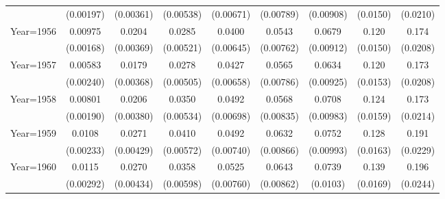 \begin{table}[htbp]
\begin{tabular}{l*{8}{c}}
                    &   (0.00197)         &   (0.00361)         &   (0.00538)         &   (0.00671)         &   (0.00789)         &   (0.00908)         &    (0.0150)         &    (0.0210)         \\
[1em]
Year=1956           &     0.00975\sym{***}&      0.0204\sym{***}&      0.0285\sym{***}&      0.0400\sym{***}&      0.0543\sym{***}&      0.0679\sym{***}&       0.120\sym{***}&       0.174\sym{***}\\
                    &   (0.00168)         &   (0.00369)         &   (0.00521)         &   (0.00645)         &   (0.00762)         &   (0.00912)         &    (0.0150)         &    (0.0208)         \\
[1em]
Year=1957           &     0.00583\sym{**} &      0.0179\sym{***}&      0.0278\sym{***}&      0.0427\sym{***}&      0.0565\sym{***}&      0.0634\sym{***}&       0.120\sym{***}&       0.173\sym{***}\\
                    &   (0.00240)         &   (0.00368)         &   (0.00505)         &   (0.00658)         &   (0.00786)         &   (0.00925)         &    (0.0153)         &    (0.0208)         \\
[1em]
Year=1958           &     0.00801\sym{***}&      0.0206\sym{***}&      0.0350\sym{***}&      0.0492\sym{***}&      0.0568\sym{***}&      0.0708\sym{***}&       0.124\sym{***}&       0.173\sym{***}\\
                    &   (0.00190)         &   (0.00380)         &   (0.00534)         &   (0.00698)         &   (0.00835)         &   (0.00983)         &    (0.0159)         &    (0.0214)         \\
[1em]
Year=1959           &      0.0108\sym{***}&      0.0271\sym{***}&      0.0410\sym{***}&      0.0492\sym{***}&      0.0632\sym{***}&      0.0752\sym{***}&       0.128\sym{***}&       0.191\sym{***}\\
                    &   (0.00233)         &   (0.00429)         &   (0.00572)         &   (0.00740)         &   (0.00866)         &   (0.00993)         &    (0.0163)         &    (0.0229)         \\
[1em]
Year=1960           &      0.0115\sym{***}&      0.0270\sym{***}&      0.0358\sym{***}&      0.0525\sym{***}&      0.0643\sym{***}&      0.0739\sym{***}&       0.139\sym{***}&       0.196\sym{***}\\
                    &   (0.00292)         &   (0.00434)         &   (0.00598)         &   (0.00760)         &   (0.00862)         &    (0.0103)         &    (0.0169)         &    (0.0244)         \\

\end{tabular}
\end{table}
